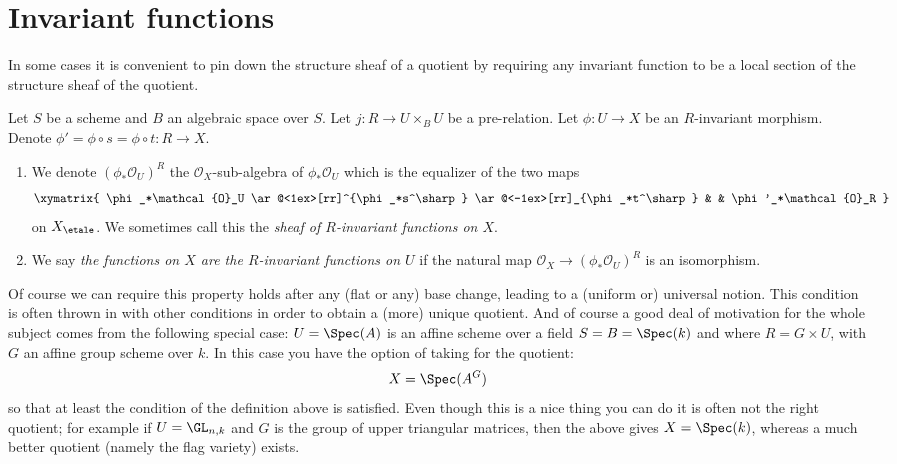 \section{Invariant functions}
\label{section-functions}

\noindent
In some cases it is convenient to pin down the structure sheaf
of a quotient by requiring any invariant function to be a local
section of the structure sheaf of the quotient.

\begin{definition}
\label{definition-functions}
Let $S$ be a scheme and $B$ an algebraic space over $S$.
Let $j : R \to U \times_B U$ be a pre-relation.
Let $\phi : U \to X$ be an $R$-invariant morphism.
Denote $\phi' = \phi \circ s = \phi \circ t : R \to X$.
\begin{enumerate}
\item We denote $(\phi_*\mathcal{O}_U)^R$ the $\mathcal{O}_X$-sub-algebra
of $\phi_*\mathcal{O}_U$ which is the equalizer of the two maps
$$
\xymatrix{
\phi_*\mathcal{O}_U
\ar@<1ex>[rr]^{\phi_*s^\sharp}
\ar@<-1ex>[rr]_{\phi_*t^\sharp}
& &
\phi'_*\mathcal{O}_R
}
$$
on $X_\etale$. We sometimes call this the
{\it sheaf of $R$-invariant functions on $X$}.
\item We say {\it the functions on $X$ are the $R$-invariant functions on
$U$} if the natural map $\mathcal{O}_X \to (\phi_*\mathcal{O}_U)^R$
is an isomorphism.
\end{enumerate}
\end{definition}

\noindent
Of course we can require this property holds after any
(flat or any) base change, leading to a (uniform or) universal notion.
This condition is often thrown in
with other conditions in order to obtain a (more) unique quotient. And of
course a good deal of motivation for the whole subject comes from the following
special case: $U = \Spec(A)$ is an affine scheme over a field
$S = B = \Spec(k)$ and where $R = G \times U$, with
$G$ an affine group scheme over $k$. In this case
you have the option of taking for the quotient:
$$
X = \Spec(A^G)
$$
so that at least the condition of the definition above is satisfied.
Even though this is a nice thing you can do it is often not the right
quotient; for example if $U = \GL_{n, k}$ and $G$ is the group of
upper triangular matrices, then the above gives $X = \Spec(k)$, whereas
a much better quotient (namely the flag variety) exists.








